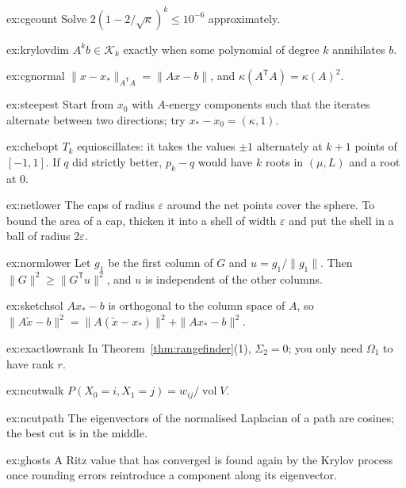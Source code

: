 \begin{hint}{ex:cgcount}
Solve $2(1-2/\sqrt\kappa)^k\le10^{-6}$ approximately.
\end{hint}
\begin{hint}{ex:krylovdim}
$A^kb\in\mathcal K_k$ exactly when some polynomial of degree $k$ annihilates $b$.
\end{hint}
\begin{hint}{ex:cgnormal}
$\|x-x_*\|_{A^{\mathsf T}A}=\|Ax-b\|$, and $\kappa(A^{\mathsf T}A)=\kappa(A)^2$.
\end{hint}
\begin{hint}{ex:steepest}
Start from $x_0$ with $A$-energy components such that the iterates alternate between two directions; try $x_*-x_0=(\kappa,1)$.
\end{hint}
\begin{hint}{ex:chebopt}
$T_k$ equioscillates: it takes the values $\pm1$ alternately at $k+1$ points of $[-1,1]$. If $q$ did strictly better, $p_k-q$ would have $k$ roots in $(\mu,L)$ and a root at $0$.
\end{hint}
\begin{hint}{ex:netlower}
The caps of radius $\varepsilon$ around the net points cover the sphere. To bound the area of a cap, thicken it into a shell of width $\varepsilon$ and put the shell in a ball of radius $2\varepsilon$.
\end{hint}
\begin{hint}{ex:normlower}
Let $g_1$ be the first column of $G$ and $u=g_1/\|g_1\|$. Then $\|G\|^2\ge\|G^{\mathsf T}u\|^2$, and $u$ is independent of the other columns.
\end{hint}
\begin{hint}{ex:sketchsol}
$Ax_*-b$ is orthogonal to the column space of $A$, so $\|A\tilde x-b\|^2=\|A(\tilde x-x_*)\|^2+\|Ax_*-b\|^2$.
\end{hint}
\begin{hint}{ex:exactlowrank}
In Theorem~\ref{thm:rangefinder}(1), $\Sigma_2=0$; you only need $\Omega_1$ to have rank $r$.
\end{hint}
\begin{hint}{ex:ncutwalk}
$P(X_0=i,X_1=j)=w_{ij}/\operatorname{vol}V$.
\end{hint}
\begin{hint}{ex:ncutpath}
The eigenvectors of the normalised Laplacian of a path are cosines; the best cut is in the middle.
\end{hint}
\begin{hint}{ex:ghosts}
A Ritz value that has converged is found again by the Krylov process once rounding errors reintroduce a component along its eigenvector.
\end{hint}

